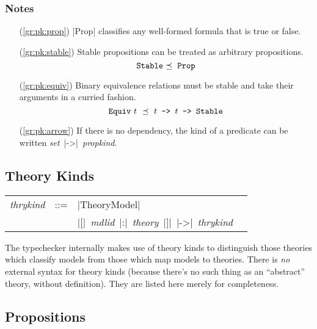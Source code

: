 \documentclass[11pt]{article}
\newcommand{\metav}[1]{\mbox{\textit{#1}}}
\newcommand{\MId}{\metav{mdlid}}
\newcommand{\Setexp}{\metav{set}}
\newcommand{\Theoryexp}{\metav{theory}}
\newcommand{\Propkind}{\metav{propkind}}
\newcommand{\Theorykind}{\metav{thrykind}}
\begin{document}
\subsubsection*{Notes}

\begin{itemize}
\item[(\ref{gr:pk:prop})] |Prop| classifies any well-formed formula that is true or false.
\item[(\ref{gr:pk:stable})] Stable propositions can be treated as arbitrary propositions.
\[
\mbox{\texttt{Stable}} \preceq\ \mbox{\texttt{Prop}}
\]
\item[(\ref{gr:pk:equiv})] Binary equivalence relations must be stable and take their arguments in a curried fashion.
\[
\mbox{\texttt{Equiv}}\ t\ \preceq\ t\texttt{\ ->\ }t\texttt{\ ->\ Stable}
\]
\item[(\ref{gr:pk:arrow})]
	If there is no dependency, the kind of a predicate can be written
	\Setexp\ |->|\ \Propkind.
\end{itemize}

\subsection{Theory Kinds}

\begin{center}
	\begin{tabular}{rRlE}
	 \Theorykind & ::= & |TheoryModel|\\
	  & \mid & |[|\ \MId\ |:|\ \Theoryexp\ |]|\ |->|\ \Theorykind
	\end{tabular}
\end{center}

The typechecker internally makes use of theory kinds to distinguish those
theories which classify models from those which map models to theories.
There is \emph{no} external syntax for theory kinds (because there's no
such thing as an ``abstract'' theory, without definition). They are
listed here merely for completeness.


\subsection{Propositions}
\end{document}
